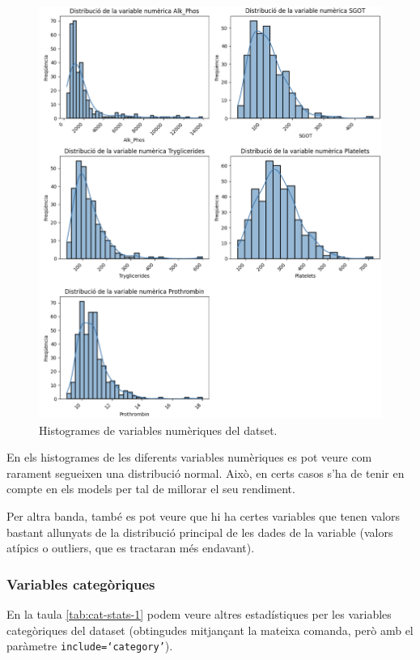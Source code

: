 \begin{figure}[H]
    \centering
    \includegraphics[width=\linewidth]{img/num-histograms-2.png}
    \caption{Histogrames de variables numèriques del datset.}
    \label{fig:num-histograms-2}
\end{figure}

En els histogrames de les diferents variables numèriques es pot veure com rarament segueixen una distribució normal. Això, en certs casos s'ha de tenir en compte en els models per tal de millorar el seu rendiment.

Per altra banda, també es pot veure que hi ha certes variables que tenen valors bastant allunyats de la distribució principal de les dades de la variable (valors atípics o outliers, que es tractaran més endavant).

\subsubsection{Variables categòriques}
En la taula \ref{tab:cat-stats-1} podem veure altres estadístiques per les variables categòriques del dataset (obtingudes mitjançant la mateixa comanda, però amb el paràmetre \texttt{include=`category'}).


